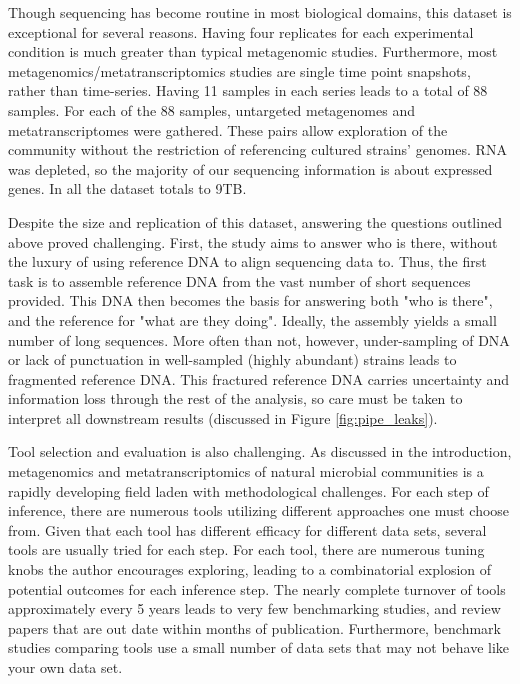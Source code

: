 Though sequencing has become routine in most biological domains, this dataset is exceptional for several reasons.
Having four replicates for each experimental condition is much greater than typical metagenomic studies.
Furthermore, most metagenomics/metatranscriptomics studies are single time point snapshots, rather than time-series.
Having 11 samples in each series leads to a total of 88 samples.
For each of the 88 samples, untargeted metagenomes and metatranscriptomes were gathered.
These pairs allow exploration of the community without the restriction of referencing cultured strains' genomes.
RNA was depleted, so the majority of our sequencing information is about expressed genes.
In all the dataset totals to 9TB.

Despite the size and replication of this dataset, answering the questions outlined above proved challenging.
First, the study aims to answer who is there, without the luxury of using reference DNA to align sequencing data to.
Thus, the first task is to assemble reference DNA from the vast number of short sequences provided.
This DNA then becomes the basis for answering both "who is there", and the reference for "what are they doing".
Ideally, the assembly yields a small number of long sequences.
More often than not, however, under-sampling of DNA or lack of punctuation in well-sampled (highly abundant) strains leads to fragmented reference DNA.
This fractured reference DNA carries uncertainty and information loss through the rest of the analysis, so care must be taken to interpret all downstream results (discussed in Figure \ref{fig:pipe_leaks}).

Tool selection and evaluation is also challenging.
As discussed in the introduction, metagenomics and metatranscriptomics of natural microbial communities is a rapidly developing field laden with methodological challenges.
For each step of inference, there are numerous tools utilizing different approaches one must choose from.
Given that each tool has different efficacy for different data sets, several tools are usually tried for each step.
For each tool, there are numerous tuning knobs the author encourages exploring, leading to a combinatorial explosion of potential outcomes for each inference step.
The nearly complete turnover of tools approximately every 5 years leads to very few benchmarking studies, and review papers that are out date within months of publication.
Furthermore, benchmark studies comparing tools use a small number of data sets that may not behave like your own data set.

